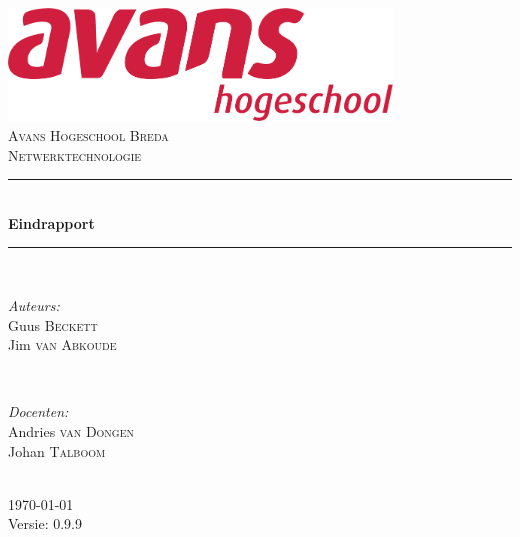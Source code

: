 \documentclass[12pt]{article}
\begin{document}
\begin{titlepage}
\newcommand{\HRule}{\rule{\linewidth}{0.5mm}} %

\center %

\includegraphics[height=3cm] {avans}\\%
\textsc{\Large Avans Hogeschool Breda}\\[0.5cm] %
\textsc{\large Netwerktechnologie}\\[0.5cm] %
\HRule \\[0.4cm]
{ \huge \bfseries Eindrapport}\\[0.4cm] %
\HRule \\[1.5cm]

\begin{minipage}{0.4\textwidth}
\begin{flushleft} \large
\emph{Auteurs:}\\
Guus \textsc{Beckett} \\%
Jim \textsc{van Abkoude}
\end{flushleft}
\end{minipage}
~
\begin{minipage}{0.4\textwidth}
\begin{flushright} \large
\emph{Docenten:} \\
Andries \textsc{van Dongen} \\ %
Johan \textsc{Talboom}
\end{flushright}
\end{minipage}\\[4cm]

{\large \today}\\[3cm] %

Versie: 0.9.9

\vfill %

\end{titlepage}
\end{document}
